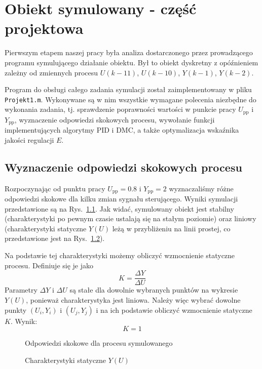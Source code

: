 \chapter{Obiekt symulowany - część projektowa}
Pierwszym etapem naszej pracy była analiza dostarczonego przez prowadzącego programu symulującego działanie obiektu. Był to obiekt dyskretny z opóźnieniem zależny od zmiennych procesu $U(k-11)$, $U(k-10)$, $Y(k-1)$, $Y(k-2)$.

Program do obsługi całego zadania symulacji został zaimplementowany w pliku \texttt{Projekt1.m}. Wykonywane są w nim wszystkie wymagane polecenia niezbędne do wykonania zadania, tj. sprawdzenie poprawności wartości w punkcie pracy $U_{\mathrm{pp}}$ i $Y_{\mathrm{pp}}$, wyznaczenie odpowiedzi skokowych procesu, wywołanie funkcji implementujących algorytmy PID i DMC, a także optymalizacja wskaźnika jakości regulacji $E$.

\section{Wyznaczenie odpowiedzi skokowych procesu}
Rozpoczynając od punktu pracy $U_{\mathrm{pp}}=\num{0,8}$ i $Y_{\mathrm{pp}}=2$ wyznaczaliśmy różne odpowiedzi skokowe dla kilku zmian sygnału sterującego. Wyniki symulacji przedstawione są na Rys.~\ref{os}. Jak widać, symulowany obiekt jest stabilny (charakterystyki po pewnym czasie ustalają się na stałym poziomie) oraz liniowy (charakterystyki statyczne $Y(U)$ leżą w przybliżeniu na linii prostej, co przedstawione jest na Rys.~\ref{char_stat}).

Na podstawie tej charakterystyki możemy obliczyć wzmocnienie statyczne procesu. Definiuje się je jako
\begin{equation}
K=\frac{\Delta Y}{\Delta U}
\end{equation}
Parametry $\Delta Y$ i $\Delta U$ są stałe dla dowolnie wybranych punktów na wykresie $Y(U)$, ponieważ charakterystyka jest liniowa. Należy więc wybrać dowolne punkty $(U_i, Y_i)$ i $(U_j, Y_j)$ i na ich podstawie obliczyć wzmocnienie statyczne $K$. Wynik:
\begin{equation}
K=1
\end{equation}

\begin{figure}
\label{os}
\centering
\caption{Odpowiedzi skokowe dla procesu symulowanego}

\end{figure}

\begin{figure}
\label{char_stat}
\centering
\caption{Charakterystyki statyczne $Y(U)$}

\end{figure}

